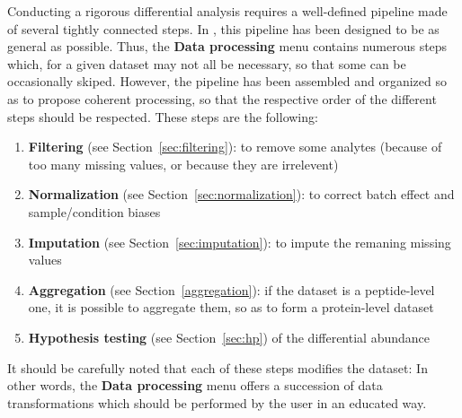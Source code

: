 \documentclass[12pt]{article}
\begin{document}
Conducting a rigorous differential analysis requires a well-defined pipeline made of several tightly connected steps. In , this pipeline has been designed to be as general as possible. Thus, the \textbf{Data processing} menu contains numerous steps which, for a given dataset may not all be necessary, so that some can be occasionally skiped. However, the pipeline has been assembled and organized so as to propose coherent processing, so that the respective order of the different steps should be respected. These steps are the following:
\begin{enumerate}
	\item \textbf{Filtering} (see Section~\ref{sec:filtering}): to remove some analytes (because of too many missing values, or because they are irrelevent)
	\item \textbf{Normalization} (see Section~\ref{sec:normalization}): to correct batch effect and sample/condition biases
	\item \textbf{Imputation} (see Section~\ref{sec:imputation}): to impute the remaning missing values
	\item \textbf{Aggregation} (see Section~\ref{aggregation}): if the dataset is a peptide-level one, it is possible to aggregate them, so as to form a protein-level dataset
	\item \textbf{Hypothesis testing} (see Section~\ref{sec:hp}) of the differential abundance
\end{enumerate}
It should be carefully noted that each of these steps modifies the dataset: In other words, the \textbf{Data processing} menu offers a succession of data transformations which should be performed by the user in an educated way.
\end{document}
